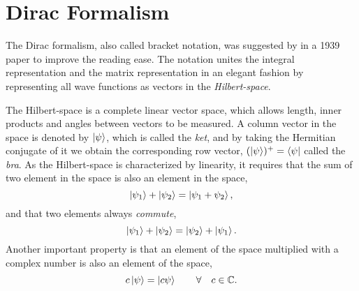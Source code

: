 \chapter{Dirac Formalism} \label{app:dirac}
The Dirac formalism, also called bracket notation, was suggested by \citet{dirac_new_1939} in a 1939 paper to improve the reading ease. The notation unites the integral representation and the matrix representation in an elegant fashion by representing all wave functions as vectors in the \textit{Hilbert-space}. 

The Hilbert-space is a complete linear vector space, which allows length, inner products and angles between vectors to be measured. A column vector in the space is denoted by $\ket{\psi}$, which is called the \textit{ket}, and by taking the Hermitian conjugate of it we obtain the corresponding row vector, $(\ket{\psi})^+=\bra{\psi}$ called the \textit{bra}. As the Hilbert-space is characterized by linearity, it requires that the sum of two element in the space is also an element in the space,
\begin{equation}
\ket{\psi_1}+\ket{\psi_2}=\ket{\psi_1+\psi_2},
\end{equation}
and that two elements always \textit{commute},
\begin{equation}
\ket{\psi_1}+\ket{\psi_2}=\ket{\psi_2}+\ket{\psi_1}.
\end{equation}
Another important property is that an element of the space multiplied with a complex number is also an element of the space,
\begin{equation}
c\ket{\psi}=\ket{c\psi}\quad\quad\forall\quad c\in\mathbb{C}.
\end{equation}

